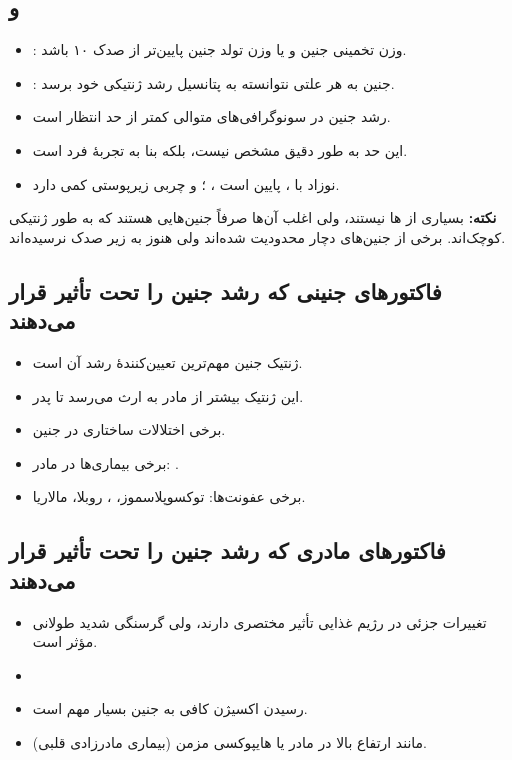 \documentclass[12pt,a4paper]{article}
\begin{document}
\subsection*{ و }
\begin{itemize}
\item {}: وزن تخمینی جنین و یا وزن تولد جنین پایین‌تر از صدک ۱۰ باشد.
\item {}: جنین به هر علتی نتوانسته به پتانسیل رشد ژنتیکی خود برسد.
\item رشد جنین در سونوگرافی‌های متوالی کمتر از حد انتظار است.
\item این حد به طور دقیق مشخص نیست، بلکه بنا به تجربهٔ فرد است.
\item نوزاد با ، پایین است ، ؛ و چربی زیرپوستی کمی دارد.
\end{itemize}

\textbf{نکته:} بسیاری از ها  نیستند، ولی اغلب آن‌ها صرفاً جنین‌هایی هستند که به طور ژنتیکی کوچک‌اند. برخی از جنین‌های  دچار محدودیت شده‌اند ولی هنوز به زیر صدک نرسیده‌اند.

\subsection*{فاکتورهای جنینی که رشد جنین را تحت تأثیر قرار می‌دهند}
\begin{itemize}
\item ژنتیک جنین مهم‌ترین تعیین‌کنندهٔ رشد آن است.
\item این ژنتیک بیشتر از مادر به ارث می‌رسد تا پدر.
\item برخی اختلالات ساختاری در جنین.
\item برخی بیماری‌ها در مادر: .
\item برخی عفونت‌ها: توکسوپلاسموز، ، روبلا، مالاریا.
\end{itemize}

\subsection*{فاکتورهای مادری که رشد جنین را تحت تأثیر قرار می‌دهند}
\begin{itemize}
\item تغییرات جزئی در رژیم غذایی تأثیر مختصری دارند، ولی گرسنگی شدید طولانی مؤثر است.
\item {}
\item رسیدن اکسیژن کافی به جنین بسیار مهم است.
\item مانند ارتفاع بالا در مادر یا هایپوکسی مزمن (بیماری مادرزادی قلبی).
\end{itemize}
\end{document}
